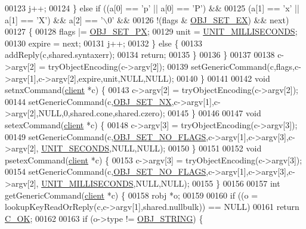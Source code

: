 \begin{DoxyCode}
{00123             j++;
00124         \} \textcolor{keywordflow}{else} \textcolor{keywordflow}{if} ((a[0] == \textcolor{stringliteral}{'p'} || a[0] == \textcolor{stringliteral}{'P'}) &&
00125                    (a[1] == \textcolor{stringliteral}{'x'} || a[1] == \textcolor{stringliteral}{'X'}) && a[2] == \textcolor{stringliteral}{'\(\backslash\)0'} &&
00126                    !(flags & \hyperlink{t__string_8c_a57e6bca7c3405142669c40d9d254a81e}{OBJ\_SET\_EX}) && next)
00127         \{
00128             flags |= \hyperlink{t__string_8c_a7b6e95f021b2885665c3ac078df68509}{OBJ\_SET\_PX};
00129             unit = \hyperlink{server_8h_a259de972533409a75b736bfc799a8e2d}{UNIT\_MILLISECONDS};
00130             expire = next;
00131             j++;
00132         \} \textcolor{keywordflow}{else} \{
00133             addReply(c,shared.syntaxerr);
00134             \textcolor{keywordflow}{return};
00135         \}
00136     \}
00137 
00138     c->argv[2] = tryObjectEncoding(c->argv[2]);
00139     setGenericCommand(c,flags,c->argv[1],c->argv[2],expire,unit,NULL,NULL);
00140 \}
00141 
00142 \textcolor{keywordtype}{void} setnxCommand(\hyperlink{structclient}{client} *c) \{
00143     c->argv[2] = tryObjectEncoding(c->argv[2]);
00144     setGenericCommand(c,\hyperlink{t__string_8c_ad2c320e7c632cb6c42ff431ec0d0bfaf}{OBJ\_SET\_NX},c->argv[1],c->argv[2],NULL,0,shared.cone,shared.czero);
00145 \}
00146 
00147 \textcolor{keywordtype}{void} setexCommand(\hyperlink{structclient}{client} *c) \{
00148     c->argv[3] = tryObjectEncoding(c->argv[3]);
00149     setGenericCommand(c,\hyperlink{t__string_8c_a066d0cea68eb46959e4de40ad0115c5b}{OBJ\_SET\_NO\_FLAGS},c->argv[1],c->argv[3],c->argv[2],
      \hyperlink{server_8h_a8553b0a6c729b15594731a0d37b4fb0d}{UNIT\_SECONDS},NULL,NULL);
00150 \}
00151 
00152 \textcolor{keywordtype}{void} psetexCommand(\hyperlink{structclient}{client} *c) \{
00153     c->argv[3] = tryObjectEncoding(c->argv[3]);
00154     setGenericCommand(c,\hyperlink{t__string_8c_a066d0cea68eb46959e4de40ad0115c5b}{OBJ\_SET\_NO\_FLAGS},c->argv[1],c->argv[3],c->argv[2],
      \hyperlink{server_8h_a259de972533409a75b736bfc799a8e2d}{UNIT\_MILLISECONDS},NULL,NULL);
00155 \}
00156 
00157 \textcolor{keywordtype}{int} getGenericCommand(\hyperlink{structclient}{client} *c) \{
00158     robj *o;
00159 
00160     \textcolor{keywordflow}{if} ((o = lookupKeyReadOrReply(c,c->argv[1],shared.nullbulk)) == NULL)
00161         \textcolor{keywordflow}{return} \hyperlink{server_8h_a303769ef1065076e68731584e758d3e1}{C\_OK};
00162 
00163     \textcolor{keywordflow}{if} (o->type != \hyperlink{server_8h_a65236ea160f69cdef33ec942092af88f}{OBJ\_STRING}) \{
}
\end{DoxyCode}
